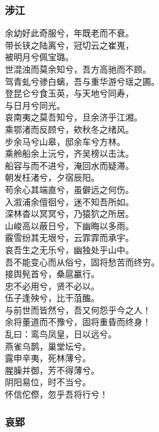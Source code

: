 \documentclass[]{article}
\begin{document}
\hypertarget{header-n2846}{%
\subsubsection{涉江}\label{header-n2846}}

余幼好此奇服兮，年既老而不衰。\\
带长铗之陆离兮，冠切云之崔嵬，\\
被明月兮佩宝璐。\\
世混浊而莫余知兮，吾方高驰而不顾。\\
驾青虬兮骖白螭，吾与重华游兮瑶之圃。\\
登昆仑兮食玉英，与天地兮同寿，\\
与日月兮同光。\\
哀南夷之莫吾知兮，旦余济乎江湘。\\
乘鄂渚而反顾兮，欸秋冬之绪风。\\
步余马兮山皋，邸余车兮方林。\\
乘舲船余上沅兮，齐吴榜以击汰。\\
船容与而不进兮，淹回水而疑滞。\\
朝发枉渚兮，夕宿辰阳。\\
苟余心其端直兮，虽僻远之何伤。\\
入溆浦余儃徊兮，迷不知吾所如。\\
深林杳以冥冥兮，乃猿狖之所居。\\
山峻高以蔽日兮，下幽晦以多雨。\\
霰雪纷其无垠兮，云霏霏而承宇。\\
哀吾生之无乐兮，幽独处乎山中。\\
吾不能变心而从俗兮，固将愁苦而终穷。\\
接舆髡首兮，桑扈臝行。\\
忠不必用兮，贤不必以。\\
伍子逢殃兮，比干菹醢。\\
与前世而皆然兮，吾又何怨乎今之人！\\
余将董道而不豫兮，固将重昏而终身！\\
乱曰：鸾鸟凤皇，日以远兮。\\
燕雀乌鹊，巢堂坛兮。\\
露申辛夷，死林薄兮。\\
腥臊并御，芳不得薄兮。\\
阴阳易位，时不当兮。\\
怀信佗傺，忽乎吾将行兮！

\hypertarget{header-n2851}{%
\subsubsection{哀郢}\label{header-n2851}}
\end{document}
